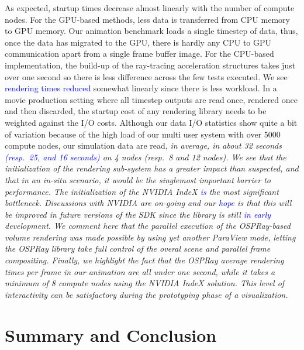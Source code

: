 \documentclass[5p,times]{elsarticle}
\begin{document}
As expected, startup times decrease almost linearly with the number of compute nodes.
For the GPU-based methods, less data is transferred from CPU memory to GPU memory.
Our animation benchmark loads a single timestep of data, thus, once the data has migrated to the GPU, there is
hardly any CPU to GPU communication apart from a single frame buffer image.
For the CPU-based implementation, the build-up of the ray-tracing
acceleration structures takes just over one second so there is less difference across the few tests executed.
We see \textcolor{blue}{rendering times reduced} somewhat linearly since there is less workload. 
In a movie production setting where all timestep outputs are read once, rendered once
and then discarded, the startup cost of any rendering library needs to be weighted
against the I/O costs. Although our data I/O statistics show quite a bit of variation
because of the high load of our multi user system with over 5000 compute nodes,
our simulation data are read, \it{in average}\rm, in about 32 seconds \textcolor{blue}{(resp.~25, and 16 seconds)}
on 4 nodes (resp.~8 and 12 nodes). We see that the initialization of the rendering sub-system
has a greater impact than suspected, and that in an \it{in-situ} \rm scenario,
it would be the singlemost important barrier to performance. The initialization of
the NVIDIA IndeX \textcolor{blue}{is} the most significant bottleneck. Discussions with NVIDIA
are on-going and our \textcolor{blue}{hope} is that this will be improved in future versions of the
SDK since the library is still \textcolor{blue}{in early} development. We comment
here that the parallel execution of the OSPRay-based volume rendering was made possible
by using yet another ParaView mode, letting the OSPRay library take full control
of the overal scene and parallel frame compositing. Finally, we highlight the fact
that the OSPRay average rendering times per frame in our animation are all under one second,
while it takes a minimum of 8 compute nodes using the NVIDIA IndeX solution. This level of interactivity
can be satisfactory during the prototyping phase of a visualization.

\section{Summary and Conclusion}
\end{document}
